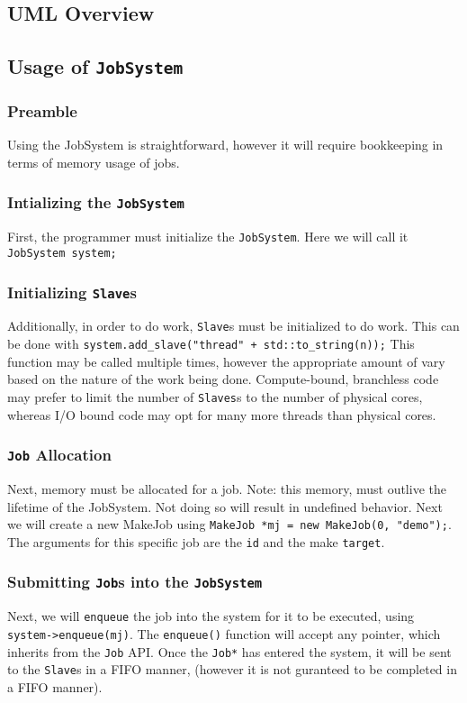 \documentclass{article}
\begin{document}
	\subsection{UML Overview}
		
	\subsection{Usage of \texttt{JobSystem}}
		\subsubsection{Preamble}
			Using the JobSystem is straightforward, however it will require bookkeeping in terms of memory usage of jobs. 
		\subsubsection{Intializing the \texttt{JobSystem}}
			First, the programmer must initialize the \texttt{JobSystem}. Here we will call it \texttt{JobSystem system;}
		\subsubsection{Initializing \texttt{Slave}s}
			Additionally, in order to do work, \texttt{Slave}s must be initialized to do work. This can be done with \texttt{system.add\_slave("thread" + std::to\_string(n));} This function may be called multiple times, however the appropriate amount of vary based on the nature of the work being done. Compute-bound, branchless code may prefer to limit the number of \texttt{Slaves}s to the number of physical cores, whereas I/O bound code may opt for many more threads than physical cores.
		\subsubsection{\texttt{Job} Allocation}
			Next, memory must be allocated for a job. Note: this memory, must outlive the lifetime of the JobSystem. Not doing so will result in undefined behavior. Next we will create a new MakeJob using \texttt{MakeJob *mj = new MakeJob(0, "demo");}. The arguments for this specific job are the \texttt{id} and the make \texttt{target}. 
		\subsubsection{Submitting \texttt{Job}s into the \texttt{JobSystem}}
			Next, we will \texttt{enqueue} the job into the system for it to be executed, using \texttt{system->enqueue(mj)}. The \texttt{enqueue()} function will accept any pointer, which inherits from the \texttt{Job} API. Once the \texttt{Job*} has entered the system, it will be sent to the \texttt{Slave}s in a FIFO manner, (however it is not guranteed to be completed in a FIFO manner).
\end{document}
